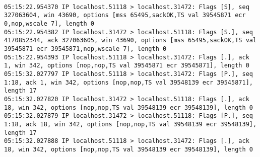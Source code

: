 \documentclass[a4paper,10pt]{article}
\begin{document}
\begin{lstlisting}

05:15:22.954370 IP localhost.51118 > localhost.31472: Flags [S], seq 327063604, win 43690, options [mss 65495,sackOK,TS val 39545871 ecr 0,nop,wscale 7], length 0
05:15:22.954382 IP localhost.31472 > localhost.51118: Flags [S.], seq 4170852344, ack 327063605, win 43690, options [mss 65495,sackOK,TS val 39545871 ecr 39545871,nop,wscale 7], length 0
05:15:22.954393 IP localhost.51118 > localhost.31472: Flags [.], ack 1, win 342, options [nop,nop,TS val 39545871 ecr 39545871], length 0
05:15:32.027797 IP localhost.51118 > localhost.31472: Flags [P.], seq 1:18, ack 1, win 342, options [nop,nop,TS val 39548139 ecr 39545871], length 17
05:15:32.027820 IP localhost.31472 > localhost.51118: Flags [.], ack 18, win 342, options [nop,nop,TS val 39548139 ecr 39548139], length 0
05:15:32.027879 IP localhost.31472 > localhost.51118: Flags [P.], seq 1:18, ack 18, win 342, options [nop,nop,TS val 39548139 ecr 39548139], length 17
05:15:32.027888 IP localhost.51118 > localhost.31472: Flags [.], ack 18, win 342, options [nop,nop,TS val 39548139 ecr 39548139], length 0

\end{lstlisting}
\end{document}
